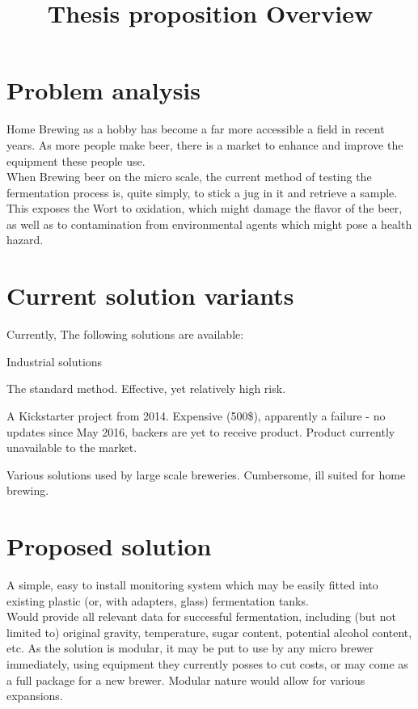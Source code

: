 \documentclass[]{article}
\title{Thesis proposition Overview}
\begin{document}
\section{Problem analysis}

Home Brewing as a hobby has become a far more accessible a field in recent years. As more people make beer, there is a market to enhance and improve the equipment these people use.\\
When Brewing beer on the micro scale, the current method of testing the fermentation process is, quite simply, to stick a jug in it and retrieve a sample. This exposes the Wort to oxidation, which might damage the flavor of the beer, as well as to contamination from environmental agents which might pose a health hazard.\\

\section{Current solution variants}
Currently, The following solutions are available:
\begin{labeling}{Industrial solutions}
	\item[By hand] The standard method. Effective, yet relatively high risk.
	\item[Brew Nanny] A Kickstarter project from 2014. Expensive (500\$), apparently a failure - no updates since May 2016, backers are yet to receive product. Product currently unavailable to the market.
	\item[Industrial solutions] Various solutions used by large scale breweries. Cumbersome, ill suited for home brewing.
\end{labeling}

\section{Proposed solution}
A simple, easy to install monitoring system which may be easily fitted into existing plastic (or, with adapters, glass) fermentation tanks.\\
Would provide all relevant data for successful fermentation, including (but not limited to) original gravity, temperature, sugar content, potential alcohol content, etc. As the solution is modular, it may be put to use by any micro brewer immediately, using equipment they currently posses to cut costs, or may come as a full package for a new brewer. Modular nature would allow for various expansions.\\
\end{document}
